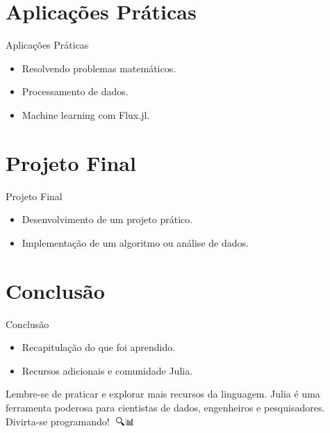 \documentclass{beamer}
\begin{document}
\section{Aplicações Práticas}
\begin{frame}{Aplicações Práticas}
    \begin{itemize}
        \item Resolvendo problemas matemáticos.
        \item Processamento de dados.
        \item Machine learning com Flux.jl.
    \end{itemize}
\end{frame}

\section{Projeto Final}
\begin{frame}{Projeto Final}
    \begin{itemize}
        \item Desenvolvimento de um projeto prático.
        \item Implementação de um algoritmo ou análise de dados.
    \end{itemize}
\end{frame}

\section{Conclusão}
\begin{frame}{Conclusão}
    \begin{itemize}
        \item Recapitulação do que foi aprendido.
        \item Recursos adicionais e comunidade Julia.
    \end{itemize}
    
    Lembre-se de praticar e explorar mais recursos da linguagem. Julia é uma ferramenta poderosa para cientistas de dados, engenheiros e pesquisadores. Divirta-se programando! 🚀🔍📊
\end{frame}
\end{document}
